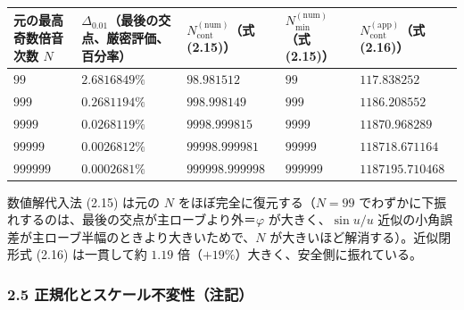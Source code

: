 \documentclass[
]{ltjsarticle}
\newcounter{none} %
\begin{document}
{\def\LTcaptype{none} %
\begin{longtable}[]{@{}
  >{\raggedleft\arraybackslash}p{}
  >{\raggedleft\arraybackslash}p{}
  >{\raggedleft\arraybackslash}p{}
  >{\raggedleft\arraybackslash}p{}
  >{\raggedleft\arraybackslash}p{}@{}}
\toprule\noalign{}
\begin{minipage}[b]{\linewidth}\raggedleft
元の最高奇数倍音次数 \(N\)
\end{minipage} & \begin{minipage}[b]{\linewidth}\raggedleft
\(\Delta_{0.01}\)（最後の交点、厳密評価、百分率）
\end{minipage} & \begin{minipage}[b]{\linewidth}\raggedleft
\(N_{\mathrm{cont}}^{(\mathrm{num})}\)（式 (2.15)）
\end{minipage} & \begin{minipage}[b]{\linewidth}\raggedleft
\(N_{\min}^{(\mathrm{num})}\)（式 (2.15)）
\end{minipage} & \begin{minipage}[b]{\linewidth}\raggedleft
\(N_{\mathrm{cont}}^{(\mathrm{app})}\)（式 (2.16)）
\end{minipage} \\
\midrule\noalign{}
\endhead
\bottomrule\noalign{}
\endlastfoot
\(99\) & \(2.6816849\%\) & \(98.981512\) & \(99\) & \(117.838252\) \\
\(999\) & \(0.2681194\%\) & \(998.998149\) & \(999\) &
\(1186.208552\) \\
\(9999\) & \(0.0268119\%\) & \(9998.999815\) & \(9999\) &
\(11870.968289\) \\
\(99999\) & \(0.0026812\%\) & \(99998.999981\) & \(99999\) &
\(118718.671164\) \\
\(999999\) & \(0.0002681\%\) & \(999998.999998\) & \(999999\) &
\(1187195.710468\) \\
\end{longtable}
}

数値解代入法 (2.15) は元の \(N\) をほぼ完全に復元する（\(N=99\)
でわずかに下振れするのは、最後の交点が主ローブより外＝\(\varphi\)
が大きく、\(\sin u/u\)
近似の小角誤差が主ローブ半幅のときより大きいためで、\(N\)
が大きいほど解消する）。近似閉形式 (2.16) は一貫して約 \(1.19\)
倍（\(+19\%\)）大きく、安全側に振れている。

\subsubsection{2.5
正規化とスケール不変性（注記）}\label{ux6b63ux898fux5316ux3068ux30b9ux30b1ux30fcux30ebux4e0dux5909ux6027ux6ce8ux8a18}
\end{document}
